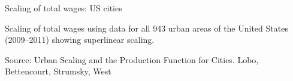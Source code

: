 \documentclass[]{beamer} %
\begin{document}
\begin{frame}{Scaling of total wages: US cities}

\vspace{-.3cm}
\small Scaling of total wages using data for all 943 urban areas of the United States (2009–2011) showing superlinear scaling.

\vspace{.1cm}
\tiny Source: Urban Scaling and the Production Function for Cities. Lobo, Bettencourt, Strumsky, West
\end{frame}





\end{document}
